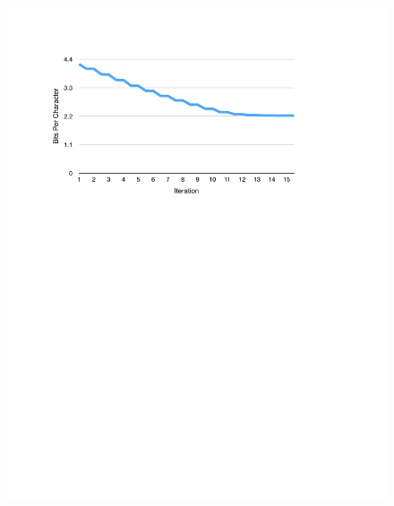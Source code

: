 \documentclass[11pt, oneside, fleqn]{article}
\begin{document}
  \begin{figure}[h]
  \includegraphics{./figure/bit_of_char_per_iteration.pdf}
  \end{figure}
\end{document}
